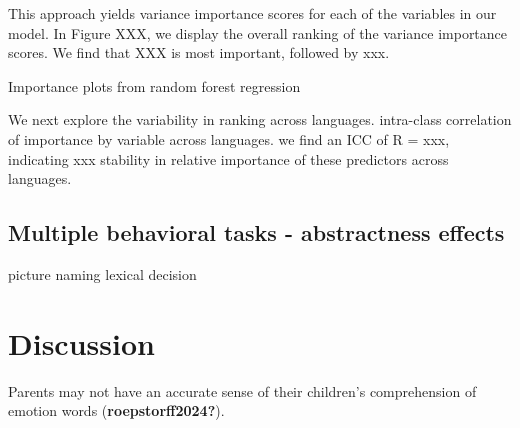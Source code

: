 \documentclass[
  man,floatsintext]{apa6}
\begin{document}
This approach yields variance importance scores for each of the variables in our model. In Figure XXX, we display the overall ranking of the variance importance scores. We find that XXX is most important, followed by xxx.

Importance plots from random forest regression

We next explore the variability in ranking across languages. intra-class correlation of importance by variable across languages. we find an ICC of R = xxx, indicating xxx stability in relative importance of these predictors across languages.

\hypertarget{multiple-behavioral-tasks---abstractness-effects}{%
\subsection{Multiple behavioral tasks - abstractness effects}\label{multiple-behavioral-tasks---abstractness-effects}}

picture naming lexical decision

\hypertarget{discussion}{%
\section{Discussion}\label{discussion}}

Parents may not have an accurate sense of their children's comprehension of emotion words (\textbf{roepstorff2024?}).
\end{document}
